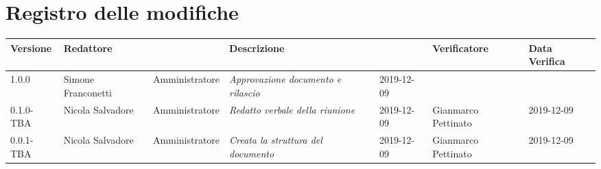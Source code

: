 \section*{Registro delle modifiche}
\renewcommand{\arraystretch}{1.8}
  \setlength\LTleft{-1.7cm}
  \begin{longtable}{|p{1.7cm}|p{2cm}|p{2.5cm}|p{3cm}|p{1.7cm}|p{2cm}|p{2.3cm}|}
    \hline
    \rowcolor{header}
    \textbf{Versione} & \textbf{Redattore} & \centering{\textbf{Ruolo}} & \textbf{Descrizione} &      \centering{\textbf{Data}} & \textbf{Verificatore} & \textbf{Data Verifica} \\
    \hline
    1.0.0 & Simone Franconetti & Amministratore & \small{\textit{Approvazione documento e rilascio}} & 2019-12-09 & & \\
    0.1.0-TBA & Nicola Salvadore & Amministratore & \small{\textit{Redatto verbale della riunione}} & 2019-12-09 & Gianmarco Pettinato & 2019-12-09 \\
    0.0.1-TBA & Nicola Salvadore & Amministratore & \small{\textit{Creata la struttura del documento}} & 2019-12-09 & Gianmarco Pettinato & 2019-12-09 \\

    \hline
  \end{longtable}
  \setlength\LTleft{0cm}
